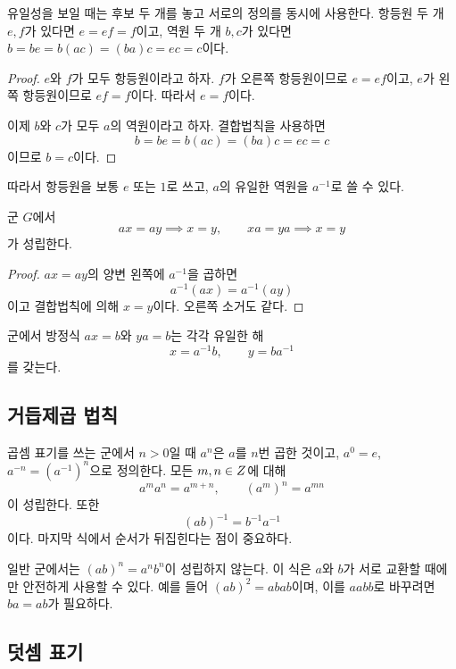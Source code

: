 \begin{proofidea}
유일성을 보일 때는 후보 두 개를 놓고 서로의 정의를 동시에 사용한다. 항등원 두 개 $e,f$가 있다면 $e=ef=f$이고, 역원 두 개 $b,c$가 있다면 $b=be=b(ac)=(ba)c=ec=c$이다.
\end{proofidea}

\begin{proof}
$e$와 $f$가 모두 항등원이라고 하자. $f$가 오른쪽 항등원이므로 $e=ef$이고, $e$가 왼쪽 항등원이므로 $ef=f$이다. 따라서 $e=f$이다.

이제 $b$와 $c$가 모두 $a$의 역원이라고 하자. 결합법칙을 사용하면
\[
  b=be=b(ac)=(ba)c=ec=c
\]
이므로 $b=c$이다.
\end{proof}

따라서 항등원을 보통 $e$ 또는 $1$로 쓰고, $a$의 유일한 역원을 $a^{-1}$로 쓸 수 있다.

\begin{proposition}[소거법칙]
군 $G$에서
\[
  ax=ay\implies x=y,\qquad xa=ya\implies x=y
\]
가 성립한다.
\end{proposition}

\begin{proof}
$ax=ay$의 양변 왼쪽에 $a^{-1}$을 곱하면
\[
  a^{-1}(ax)=a^{-1}(ay)
\]
이고 결합법칙에 의해 $x=y$이다. 오른쪽 소거도 같다.
\end{proof}

\begin{corollary}
군에서 방정식 $ax=b$와 $ya=b$는 각각 유일한 해
\[
  x=a^{-1}b,\qquad y=ba^{-1}
\]
를 갖는다.
\end{corollary}

\subsection{거듭제곱 법칙}

곱셈 표기를 쓰는 군에서 $n>0$일 때 $a^n$은 $a$를 $n$번 곱한 것이고, $a^0=e$, $a^{-n}=(a^{-1})^n$으로 정의한다. 모든 $m,n\in Z$에 대해
\[
  a^ma^n=a^{m+n},\qquad (a^m)^n=a^{mn}
\]
이 성립한다. 또한
\[
  (ab)^{-1}=b^{-1}a^{-1}
\]
이다. 마지막 식에서 순서가 뒤집힌다는 점이 중요하다.

\begin{pitfall}
일반 군에서는 $(ab)^n=a^nb^n$이 성립하지 않는다. 이 식은 $a$와 $b$가 서로 교환할 때에만 안전하게 사용할 수 있다. 예를 들어 $(ab)^2=abab$이며, 이를 $aabb$로 바꾸려면 $ba=ab$가 필요하다.
\end{pitfall}

\subsection{덧셈 표기}

